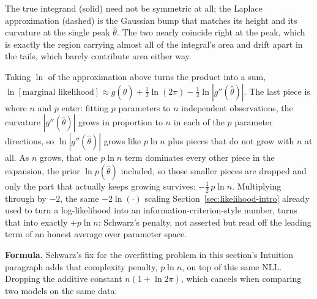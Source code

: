 \documentclass[11pt]{article}
\begin{document}
\begin{center}
\end{center}
\begin{center}
\footnotesize
The true integrand (solid) need not be symmetric at all; the Laplace
approximation (dashed) is the Gaussian bump that matches its height and
its curvature at the single peak $\hat\theta$. The two nearly coincide
right at the peak, which is exactly the region carrying almost all of
the integral's area and drift apart in the tails, which barely
contribute area either way.
\end{center}

Taking $\ln$ of the approximation above turns the product into a sum,
$\ln[\text{marginal likelihood}] \approx g(\hat\theta) + \tfrac12\ln(2\pi)
- \tfrac12\ln|g''(\hat\theta)|$. The last piece is where $n$ and $p$
enter: fitting $p$ parameters to $n$ independent observations, the
curvature $|g''(\hat\theta)|$ grows in proportion to $n$ in each of the
$p$ parameter directions, so $\ln|g''(\hat\theta)|$ grows like $p\ln n$
plus pieces that do not grow with $n$ at all. As $n$ grows, that one
$p\ln n$ term dominates every other piece in the expansion, the prior
$\ln p(\hat\theta)$ included, so those smaller pieces are dropped and
only the part that actually keeps growing survives: $-\tfrac12\,p\ln n$.
Multiplying through by $-2$, the same $-2\ln(\cdot)$ scaling
Section~\ref{sec:likelihood-intro} already used to turn a
log-likelihood into an information-criterion-style number, turns that
into exactly $+p\ln n$: Schwarz's penalty, not asserted but read off
the leading term of an honest average over parameter space.

\textbf{Formula.} Schwarz's fix for the overfitting problem in this
section's Intuition paragraph adds that complexity penalty, $p \ln n$,
on top of this same $\mathrm{NLL}$. Dropping the additive constant
$n(1+\ln 2\pi)$, which cancels when comparing two models on the same
data:
\end{document}
